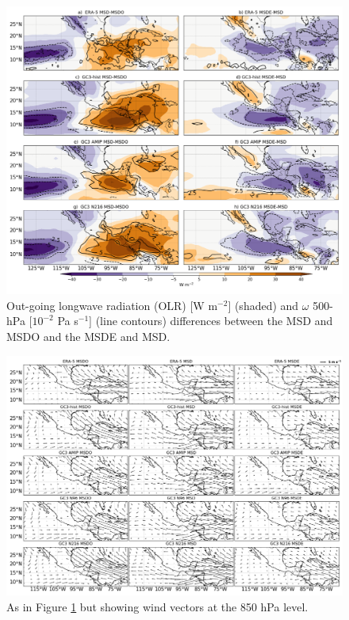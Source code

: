  \begin{figure}[t!]
\includegraphics[width=\linewidth]{figures/fig4_olrdiff.png}
\caption{Out-going longwave radiation (OLR) [W m$^{-2}$] (shaded) and $\omega$ 500-hPa [$10^{-2}$ Pa s$^{-1}$] (line contours) differences between the MSD and MSDO and the MSDE and MSD.}
\label{fig:msdolranom}
\end{figure}


 \begin{figure}[t!]
\includegraphics[width=\linewidth]{figures/modcompar_dif2u3}
\caption{As in Figure \ref{fig:msdolranom} but showing wind vectors at the 850 hPa level. }
\label{fig:msduanom}
\end{figure}


